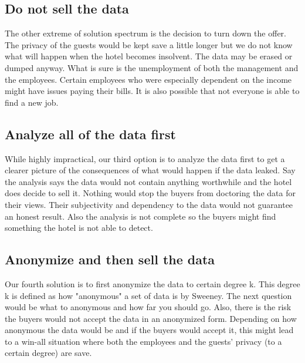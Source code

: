 \subsection{Do not sell the data}
The other extreme of solution spectrum is the decision to turn down the offer. The privacy of the guests would be kept save a little longer but we do not know what will happen when the hotel becomes insolvent. The data may be erased or dumped anyway. What is sure is the unemployment of both the management and the employees. Certain employees who were especially dependent on the income might have issues paying their bills. It is also possible that not everyone is able to find a new job. 

\subsection{Analyze all of the data first}
While highly impractical, our third option is to analyze the data first to get a clearer picture of the consequences of what would happen if the data leaked. Say the analysis says the data would not contain anything worthwhile and the hotel does decide to sell it. Nothing would stop the buyers from doctoring the data for their views. Their subjectivity and dependency to the data would not guarantee an honest result. Also the analysis is not complete so the buyers might find something the hotel is not able to detect.

\subsection{Anonymize and then sell the data}
Our fourth solution is to first anonymize the data to certain degree k. This degree k is defined as how "anonymous" a set of data is by Sweeney\cite{k_anonymity}. The next question would be what to anonymous and how far you should go. Also, there is the risk the buyers would not accept the data in an anonymized form. Depending on how anonymous the data would be and if the buyers would accept it, this might lead to a win-all situation where both the employees and the guests' privacy (to a certain degree) are save.


